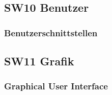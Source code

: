 \documentclass[
  10pt,
  a4paper,
]{article}
\numberwithin{equation}{section}
\begin{document}
\hypertarget{sw10-benutzer}{%
\subsection{SW10 Benutzer}\label{sw10-benutzer}}

\hypertarget{benutzerschnittstellen}{%
\subsubsection{Benutzerschnittstellen}\label{benutzerschnittstellen}}

\hypertarget{sw11-grafik}{%
\subsection{SW11 Grafik}\label{sw11-grafik}}

\hypertarget{graphical-user-interface}{%
\subsubsection{Graphical User
Interface}\label{graphical-user-interface}}
\end{document}
